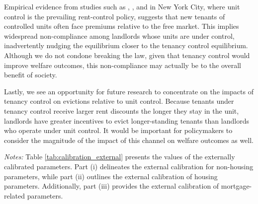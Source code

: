 \documentclass[parskip=full]{article}
\newenvironment{fignote2}[1]
{
\par
\medskip
\begin{minipage}{#1}
\footnotesize
}
{
\end{minipage}
}
\begin{document}
Empirical evidence from studies such as \citet{nagy-1997}, \citet{early-2000}, and \citet{cjq-2023} in New York City, where unit control is the prevailing rent-control policy, suggests that new tenants of controlled units often face premiums relative to the free market. This implies widespread non-compliance among landlords whose units are under control, inadvertently nudging the equilibrium closer to the tenancy control equilibrium. Although we do not condone breaking the law, given that tenancy control would improve welfare outcomes, this non-compliance may actually be to the overall benefit of society.

Lastly, we see an opportunity for future research to concentrate on the impacts of tenancy control on evictions relative to unit control. Because tenants under tenancy control receive larger rent discounts the longer they stay in the unit, landlords have greater incentives to evict longer-standing tenants than landlords who operate under unit control. It would be important for policymakers to consider the magnitude of the impact of this channel on welfare outcomes as well.




\vspace{1cm}

\begin{table}[H]
    \centering
    \caption{Externally assigned parameter values}
    \vspace{-1.25cm}
    \label{tab:calibration_external}
    
    \vspace{-0.5cm}
    \begin{fignote2}{1.11\textwidth}
    \textit{Notes:} Table \ref{tab:calibration_external} presents the values of the externally calibrated parameters. Part (i) delineates the external calibration for non-housing parameters, while part (ii) outlines the external calibration of housing parameters. Additionally, part (iii) provides the external calibration of mortgage-related parameters.
    \end{fignote2}
\end{table}
\end{document}
